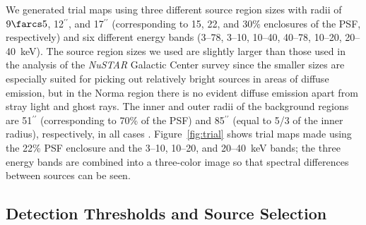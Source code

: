 \documentclass[iop,revtex4]{emulateapj}
\begin{document}
We generated trial maps using three different source region sizes with radii of $9\farcs5$, 12$^{\prime\prime}$, and 17$^{\prime\prime}$ (corresponding to 15, 22, and 30\% enclosures of the PSF, respectively) and six different energy bands (3--78, 3--10, 10--40, 40--78, 10--20, 20--40~keV).  The source region sizes we used are slightly larger than those used in the analysis of the \textit{NuSTAR} Galactic Center survey since the smaller sizes are especially suited for picking out relatively bright sources in areas of diffuse emission, but in the Norma region there is no evident diffuse emission apart from stray light and ghost rays.  The inner and outer radii of the background regions are 51$^{\prime\prime}$ (corresponding to 70\% of the PSF) and 85$^{\prime\prime}$ (equal to 5/3 of the inner radius), respectively, in all cases .  Figure~\ref{fig:trial} shows trial maps made using the 22\% PSF enclosure and the 3--10, 10--20, and 20--40~keV bands; the three energy bands are combined into a three-color image so that spectral differences between sources can be seen. 

\begin{figure*}[t]
\caption{Composite trial map showing the 3--10~keV band in red, 10--20~keV band in green, and 20--40~keV band in blue.  The colors are scaled by the logarithmic trial map values.  Tier~1 sources are labeled in green, if they were observed by NARCS or were previously well-studied, or cyan, if they were discovered by the \textit{NuSTAR} Norma survey.  Tier~2 sources are labeled in yellow.  The streaks in the vicinity of NNR~2 are due to stray light which has not been removed because NNR~2 is partially embedded in it.  The small streaks seen in the area covered by the first mini-survey are due to ghost rays from NNR~1. }
\label{fig:trial}
\end{figure*}

\subsection{Detection Thresholds and Source Selection}
\label{sec:threshold}
\end{document}
